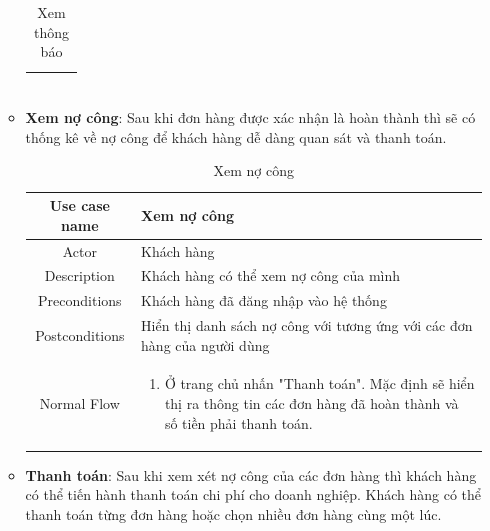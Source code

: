 \begin{itemize}
\begin{itemize}
\begin{table}[H]
\begin{tabular}{|c|m{25em}|}
\begin{enumerate}
					\end{enumerate}
					\\
					\hline
				\end{tabular}
				\caption{Xem thông báo}
			\end{table}
		
			\item \textbf{Xem nợ công}: Sau khi đơn hàng được xác nhận là hoàn thành thì sẽ có thống kê về nợ công để khách hàng dễ dàng quan sát và thanh toán.
			
			\begin{table}[H]
				\centering\begin{tabular}{|c|m{25em}|}
					\hline 
					Use case name & Xem nợ công\\ 
					\hline 
					Actor & Khách hàng \\ 
					\hline
					Description & Khách hàng có thể xem nợ công của mình \\
					\hline 
					Preconditions & Khách hàng đã đăng nhập vào hệ thống \\
					\hline
					Postconditions & Hiển thị danh sách nợ công với tương ứng với các đơn hàng của người dùng \\
					\hline
					Normal Flow & \begin{enumerate}
						\item Ở trang chủ nhấn "Thanh toán". Mặc định sẽ hiển thị ra thông tin các đơn hàng đã hoàn thành và số tiền phải thanh toán.
					
						
					\end{enumerate}
					\\
					\hline
				\end{tabular}
				\caption{Xem nợ công}
			\end{table}
		
			\item \textbf{Thanh toán}: Sau khi xem xét nợ công của các đơn hàng thì khách hàng có thể tiến hành thanh toán chi phí cho doanh nghiệp. Khách hàng có thể thanh toán từng đơn hàng hoặc chọn nhiều đơn hàng cùng một lúc.
			

\end{itemize}
\end{itemize}
